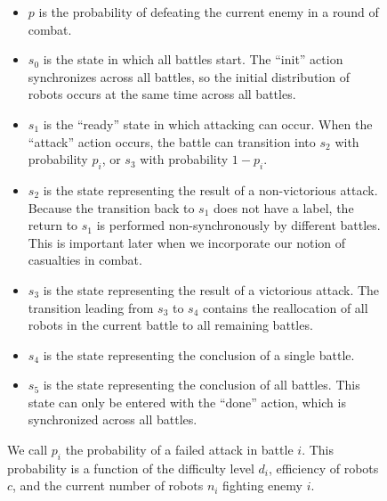 \documentclass[11pt]{article}
\theoremstyle{definition}
\begin{document}
\begin{figure}
    \begin{itemize}
        \item $p$ is the probability of defeating the current
            enemy in a round of combat.
        \item $s_0$ is the state in which all battles start.
            The ``init'' action synchronizes across all
            battles, so the initial
            distribution of robots occurs at the same time
            across all battles.
        \item $s_1$ is the ``ready'' state in which
            attacking can occur. When the ``attack'' action
            occurs, the battle can transition into
            $s_2$ with probability $p_i$, or
            $s_3$ with probability $1 - p_i$.
        \item $ s_2 $ is the state representing the result
            of a non-victorious attack. Because
            the transition back to $s_1$ does not
            have a label, the return to $s_1$ is
            performed non-synchronously by different battles.
            This is important later when we incorporate
            our notion of casualties in combat.
        \item $s_3$ is the state representing the result
            of a victorious attack. The transition
            leading from $s_3$ to $s_4$ contains
            the reallocation of all robots in the
            current battle to all remaining battles.
        \item $s_4$ is the state representing the
            conclusion of a single battle.
        \item $s_5$ is the state representing the
            conclusion of all battles. This state
            can only be entered with the ``done'' action,
            which is synchronized across all battles.
    \end{itemize}

    We call $p_i$ the probability of a failed
    attack in battle $i$. This probability
    is a function of the difficulty level $ d_i $,
    efficiency of robots $c$, and
    the current number of robots $n_i$ fighting
    enemy $i$.
\end{figure}
\end{document}
